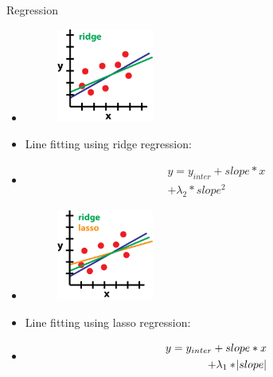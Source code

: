 \documentclass{beamer}
\begin{document}
{\begin{frame}{Regression}
	\begin{multicols}{2}
		\begin{itemize}
			\item<1->
			\begin{figure}[H]
				\centering
				\includegraphics[width=0.3\textwidth]{figures/reg2}
			\end{figure}
			\item<1-> Line fitting using ridge regression:
			\item<1-> 
				\begin{align}\nonumber
					y = y_{inter} + slope * x \\\nonumber
					+ \lambda_2 * slope^2	
				\end{align}		
		\end{itemize}	
	\end{multicols}			
	\begin{multicols}{2}
		\begin{itemize}
			\item<2->
			\begin{figure}[H]
				\centering
				\includegraphics[width=0.3\textwidth]{figures/reg3}
			\end{figure}
			\item<2-> Line fitting using lasso regression:
			\item<2-> 
				\begin{align}\nonumber
					y = y_{inter} + slope * x \\
					+ \lambda_1 * \abs{slope}\nonumber	
				\end{align}		
		\end{itemize}	
	\end{multicols}		
\end{frame}

}
\end{document}
